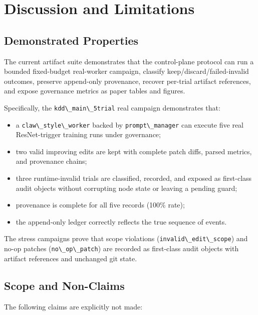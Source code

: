 \section{Discussion and Limitations}\label{discussion-and-limitations}

\subsection{Demonstrated Properties}\label{demonstrated-properties}

The current artifact suite demonstrates that the control-plane protocol can run a bounded fixed-budget real-worker campaign, classify keep/discard/failed-invalid outcomes, preserve append-only provenance, recover per-trial artifact references, and expose governance metrics as paper tables and figures.

Specifically, the \passthrough{\lstinline!kdd\_main\_5trial!} real campaign demonstrates that:

\begin{itemize}
\tightlist
\item
  a \passthrough{\lstinline!claw\_style\_worker!} backed by \passthrough{\lstinline!prompt\_manager!} can execute five real ResNet-trigger training runs under governance;
\item
  two valid improving edits are kept with complete patch diffs, parsed metrics, and provenance chains;
\item
  three runtime-invalid trials are classified, recorded, and exposed as first-class audit objects without corrupting node state or leaving a pending guard;
\item
  provenance is complete for all five records (100\% rate);
\item
  the append-only ledger correctly reflects the true sequence of events.
\end{itemize}

The stress campaigns prove that scope violations (\passthrough{\lstinline!invalid\_edit\_scope!}) and no-op patches (\passthrough{\lstinline!no\_op\_patch!}) are recorded as first-class audit objects with artifact references and unchanged git state.

\subsection{Scope and Non-Claims}\label{scope-and-non-claims}

The following claims are explicitly not made:

